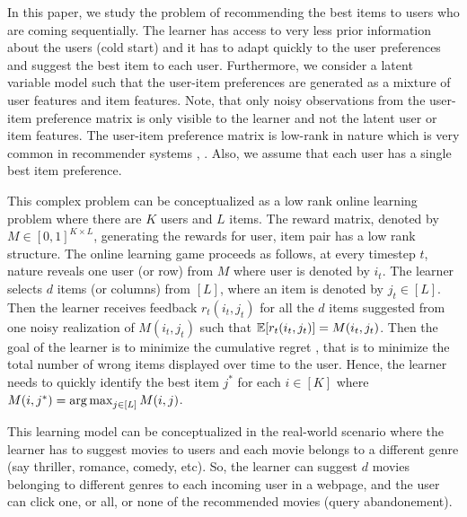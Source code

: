 In this paper, we study the problem of recommending the best items to users who are coming sequentially. The learner has access to very less prior information about the users (cold start) and it has to adapt quickly to the user preferences and suggest the best item to each user. Furthermore, we consider a latent variable model such that the user-item preferences are generated as a mixture of user features and item features. Note, that only noisy observations from the user-item preference matrix is only visible to the learner and not the latent user or item features. The user-item preference matrix is low-rank in nature which is very common in recommender systems \citep{koren2009matrix}, \citep{ricci2011liorrokach}. Also, we assume that each user has a single best item preference.

	This complex problem can be conceptualized as a low rank online learning  problem where there are $K$ users and $L$ items. The reward matrix, denoted by $M\in [0,1]^{K\times L}$,  generating the rewards for user, item pair has a low rank structure. The online learning game proceeds as follows, at every timestep $t$,  nature reveals one user (or row) from $M$ where user is denoted by $i_t$. The learner selects $d$ items (or columns) from $[L]$, where an item is denoted by $j_t\in [L]$. Then the learner receives feedback $r_{t}(i_t,j_t)$ for all the $d$ items suggested from one noisy realization of $M(i_t,j_t)$ such that $\mathbb{E}[r_{t}(i_t,j_t)] = M(i_t,j_t)$. Then the goal of the learner is to minimize the cumulative regret , that is to minimize the total number of wrong items displayed over time to the user. Hence, the learner needs to quickly identify the best item $j^*$ for each $i\in [K]$ where $M(i,j^*) = \mathop{\rm arg\,max} _{j\in[L]} M(i,j)$. 
	
	This learning model can be conceptualized in the real-world scenario where the learner has  to suggest movies to users and each movie belongs to a different genre (say thriller, romance, comedy, etc). So, the learner can suggest $d$ movies belonging to different genres to each incoming user in a webpage, and the user can click one, or all, or none of the recommended movies (query abandonement).	
	
